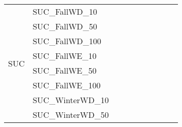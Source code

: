\begin{table}[]
{\begin{tabular}{|c|l|ll|ll|ll|l|l|}
			\multirow{24}{*}{SUC}   & SUC\_FallWD\_10               &                                   &                                  &                           &                          &                           &                          &                                       &                                \\
			& SUC\_FallWD\_50               &                                   &                                  &                           &                          &                           &                          &                                       &                                \\
			& SUC\_FallWD\_100              &                                   &                                  &                           &                          &                           &                          &                                       &                                \\
			& SUC\_FallWE\_10               &                                   &                                  &                           &                          &                           &                          &                                       &                                \\
			& SUC\_FallWE\_50               &                                   &                                  &                           &                          &                           &                          &                                       &                                \\
			& SUC\_FallWE\_100              &                                   &                                  &                           &                          &                           &                          &                                       &                                \\
			& SUC\_WinterWD\_10             &                                   &                                  &                           &                          &                           &                          &                                       &                                \\
			& SUC\_WinterWD\_50             &                                   &                                  &                           &                          &                           &                          &                                       &                                \\

\end{tabular}}
\end{table}
